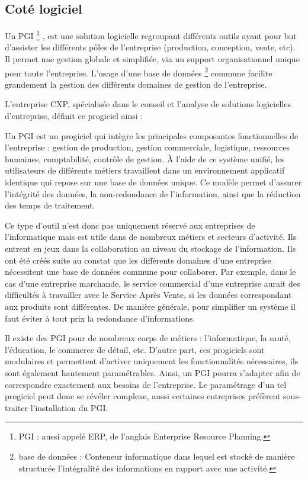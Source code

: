 \subsection{Coté logiciel}

Un \gls{PGI} \footnote{PGI : aussi appelé ERP, de l'anglais Enterprise Resource Planning.} , est une solution logicielle regroupant différents outils ayant pour but d'assister les différents pôles de l'entreprise (production, conception, vente, etc). Il permet une gestion globale et simplifiée, via un support organisationnel unique pour toute l'entreprise. L'usage d'une base de données \footnote{base de données : Conteneur informatique dans lequel est stocké de manière structurée l'intégralité des informations en rapport avec une activité.} commune facilite grandement la gestion des différents domaines de gestion de l'entreprise.

L'entreprise CXP, spécialisée dans le conseil et l'analyse de solutions logicielles d'entreprise, définit ce progiciel ainsi :

\begin{Quote}
Un PGI est un progiciel qui intègre les principales composantes fonctionnelles de l'entreprise : gestion de production, gestion commerciale, logistique, ressources humaines, comptabilité, contrôle de gestion.
À l'aide de ce système unifié, les utilisateurs de différents métiers travaillent dans un environnement applicatif identique qui repose sur une base de données unique. Ce modèle permet d'assurer l'intégrité des données, la non-redondance de l'information, ainsi que la réduction des temps de traitement.
\end{Quote}

Ce type d'outil n'est donc pas uniquement réservé aux entreprises de l'informatique mais est utile dans de nombreux métiers et secteurs d'activité. Ils entrent en jeux dans la collaboration au niveau du stockage de l'information. Ils ont été créés suite au constat que les différents domaines d'une entreprise nécessitent une base de données commune pour collaborer. Par exemple, dans le cas d'une entreprise marchande, le service commercial d'une entreprise aurait des difficultés à travailler avec le Service Après Vente, si les données correspondant aux produits sont différentes. De manière générale, pour simplifier un système il faut éviter à tout prix la redondance d'informations.

Il existe des PGI pour de nombreux corps de métiers : l'informatique, la santé, l'éducation, le commerce de détail, etc. D'autre part, ces progiciels sont modulaires et permettent d'activer uniquement les fonctionnalités nécessaires, ils sont également hautement paramétrables. Ainsi, un PGI pourra s'adapter afin de correspondre exactement aux besoins de l'entreprise. Le paramétrage d'un tel progiciel peut donc se révéler complexe, aussi certaines entreprises préfèrent sous-traiter l'installation du PGI.

